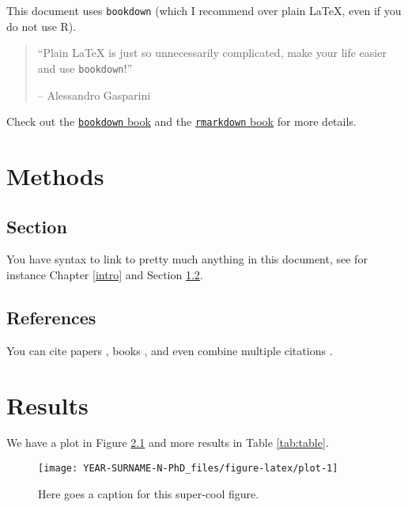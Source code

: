 \documentclass[
  12pt,
  oneside]{book}
\begin{document}
This document uses \texttt{bookdown} (which I recommend over plain \LaTeX{}, even if you do not use R).

\begin{quote}
``Plain \LaTeX{} is just so unnecessarily complicated, make your life easier and use \texttt{bookdown}!''

-- Alessandro Gasparini
\end{quote}

Check out the \href{https://bookdown.org/yihui/bookdown/}{\texttt{bookdown} book} and the \href{https://bookdown.org/yihui/rmarkdown/}{\texttt{rmarkdown} book} for more details.

\hypertarget{methods}{%
\chapter{Methods}\label{methods}}

\hypertarget{methods-section}{%
\section{Section}\label{methods-section}}

You have syntax to link to pretty much anything in this document, see for instance Chapter \ref{intro} and Section \ref{methods-references}.

\hypertarget{methods-references}{%
\section{References}\label{methods-references}}

You can cite papers \citep{gasparini_2018}, books \citep{brent_1973}, and even combine multiple citations \citep{R, scopus}.

\hypertarget{results}{%
\chapter{Results}\label{results}}

We have a plot in Figure \ref{fig:plot} and more results in Table \ref{tab:table}.

\begin{figure}

{\centering \texttt{[image: YEAR-SURNAME-N-PhD\_files/figure-latex/plot-1]} 

}

\caption{Here goes a caption for this super-cool figure.}\label{fig:plot}
\end{figure}
\end{document}
